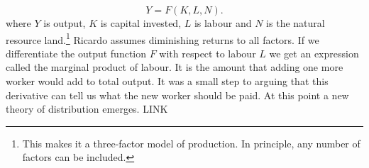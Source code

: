 
\begin{equation} 
Y=F(K,L,N).
\label{eqn-production-ricardo}
\end{equation} 
where  $Y$ is output, $K$ is capital invested, $L$ is labour and $N$  is the natural resource land.\footnote{This makes it a three-factor model of production.  In principle, any number of factors can be included.}  
Ricardo assumes diminishing returns to all factors. If we differentiate the output function $F$ with respect to labour $L$ we get an expression called the marginal product of labour. It is the amount that adding one more worker would add to total output. It was a small step to arguing that this derivative can tell us what the new worker should be paid. At this point a new theory of distribution emerges.  LINK




